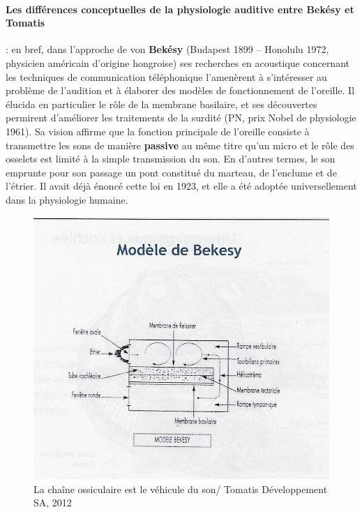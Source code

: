 \paragraph{Les différences conceptuelles de la physiologie auditive
  entre Bekésy et Tomatis}: en bref, dans  l'approche de von \textbf{ Bekésy} (Budapest 1899 -- Honolulu 
  1972,
physicien américain d'origine hongroise) ses
recherches en acoustique concernant les techniques de communication
téléphonique l'amenèrent à s'intéresser au problème de l'audition et à
élaborer des modèles de fonctionnement de l'oreille. Il élucida en
particulier le rôle de la membrane basilaire, et ses découvertes
permirent d'améliorer les traitements de la surdité (PN, prix
Nobel de physiologie 1961).
Sa vision affirme que la fonction principale de l'oreille 
consiste à transmettre les sons de manière \textbf{passive} au même titre qu'un micro et le rôle des 
osselets
est limité à la simple transmission du
son. En d'autres termes, le son emprunte pour son passage un pont  constitué du marteau, de l'enclume 
et de l'étrier. Il avait déjà énoncé cette loi en 1923, et elle a été adoptée
universellement dans la physiologie humaine.
\begin{figure}
	\centering
	\includegraphics[width=1.0\linewidth]{images/Cochleederoule_bas.jpg}
	\caption[Modèle de Békésy]{La chaîne ossiculaire est le véhicule du son/ 
		Tomatis Développement SA, 2012}
	\label{fig:cochleederoulebas}
\end{figure}




